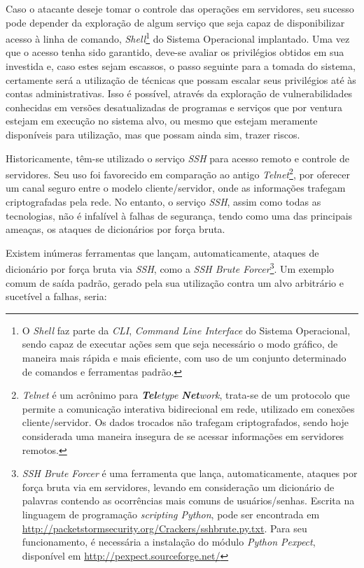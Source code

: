 Caso o atacante deseje tomar o controle das operações em servidores, seu sucesso pode depender da exploração de algum serviço que seja capaz de disponibilizar acesso à linha de comando, \textit{Shell}\footnote{O \textit{Shell} faz parte da \textit{CLI}, \textit{Command Line Interface} do Sistema Operacional, sendo capaz de executar ações sem que seja necessário o modo gráfico, de maneira mais rápida e mais eficiente, com uso de um conjunto determinado de comandos e ferramentas padrão.} do Sistema Operacional implantado. Uma vez que o acesso tenha sido garantido, deve-se avaliar os privilégios obtidos em sua investida e, caso estes sejam escassos, o passo seguinte para a tomada do sistema, certamente será a utilização de técnicas que possam escalar seus privilégios até às contas administrativas. Isso é possível, através da exploração de vulnerabilidades conhecidas em versões desatualizadas  de programas e serviços que por ventura estejam em execução no sistema alvo, ou mesmo que estejam meramente disponíveis para utilização, mas que possam ainda sim, trazer riscos. \cite{PrivilegeEscalation}

Historicamente, têm-se utilizado o serviço \textit{SSH} para acesso remoto e controle de servidores. Seu uso foi favorecido em comparação ao antigo \textit{Telnet}\footnote{\textit{Telnet} é um acrônimo para \textit{\textbf{Tel}etype \textbf{Net}work}, trata-se de um protocolo que permite a comunicação interativa bidirecional em rede, utilizado em conexões cliente/servidor. Os dados trocados não trafegam criptografados, sendo hoje considerada uma maneira insegura de se acessar informações em servidores remotos.}, por oferecer um canal seguro entre o modelo cliente/servidor, onde as informações trafegam criptografadas pela rede. No entanto, o serviço \textit{SSH}, assim como todas as tecnologias, não é infalível à falhas de segurança, tendo como uma das principais ameaças, os ataques de dicionários por força bruta.

Existem inúmeras ferramentas que lançam, automaticamente, ataques de dicionário por força bruta via \textit{SSH}, como a \textit{SSH Brute Forcer}\footnote{\textit{SSH Brute Forcer} é uma ferramenta que lança, automaticamente, ataques por força bruta via em servidores, levando em consideração um dicionário de palavras contendo as ocorrências mais comuns de usuários/senhas. Escrita na linguagem de programação \textit{scripting Python}, pode ser encontrada em \url{http://packetstormsecurity.org/Crackers/sshbrute.py.txt}. Para seu funcionamento, é necessária a instalação do módulo \textit{Python Pexpect}, disponível em \url{http://pexpect.sourceforge.net/}}. Um exemplo comum de saída padrão, gerado pela sua utilização contra um alvo arbitrário e sucetível a falhas, seria:


